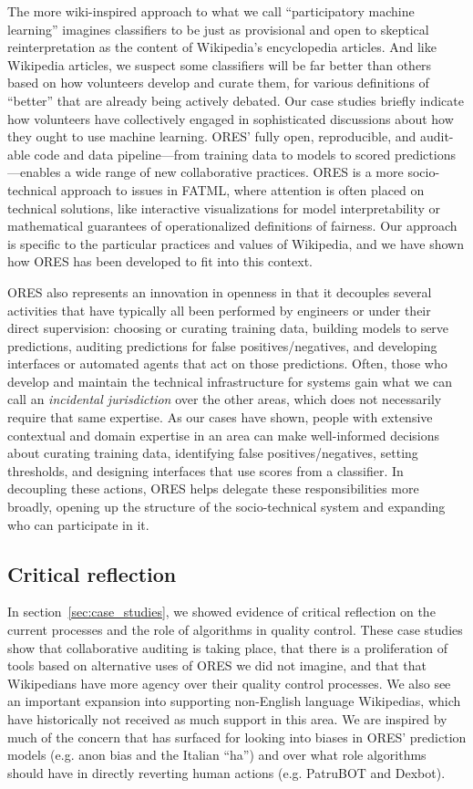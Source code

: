 The more wiki-inspired approach to what we call ``participatory machine learning'' imagines classifiers to be just as provisional and open to skeptical reinterpretation as the content of Wikipedia's encyclopedia articles. And like Wikipedia articles, we suspect some classifiers will be far better than others based on how volunteers develop and curate them, for various definitions of ``better'' that are already being actively debated. Our case studies briefly indicate how volunteers have collectively engaged in sophisticated discussions about how they ought to use machine learning. ORES' fully open, reproducible, and audit-able code and data pipeline---from training data to models to scored predictions---enables a wide range of new collaborative practices. ORES is a more socio-technical approach to issues in FATML, where attention is often placed on technical solutions, like interactive visualizations for model interpretability or mathematical guarantees of operationalized definitions of fairness. Our approach is specific to the particular practices and values of Wikipedia, and we have shown how ORES has been developed to fit into this context.

ORES also represents an innovation in openness in that it decouples several activities that have typically all been performed by engineers or under their direct supervision: choosing or curating training data, building models to serve predictions, auditing predictions for false positives/negatives, and developing interfaces or automated agents that act on those predictions. Often, those who develop and maintain the technical infrastructure for systems gain what we can call an \textit{incidental jurisdiction} over the other areas, which does not necessarily require that same expertise. As our cases have shown, people with extensive contextual and domain expertise in an area can make well-informed decisions about curating training data, identifying false positives/negatives, setting thresholds, and designing interfaces that use scores from a classifier. In decoupling these actions, ORES helps delegate these responsibilities more broadly, opening up the structure of the socio-technical system and expanding who can participate in it.

\subsection{Critical reflection}
In section~\ref{sec:case_studies}, we showed evidence of critical reflection on the current processes and the role of algorithms in quality control.  These case studies show that collaborative auditing is taking place, that there is a proliferation of tools based on alternative uses of ORES we did not imagine, and that that Wikipedians have more agency over their quality control processes. We also see an important expansion into supporting non-English language Wikipedias, which have historically not received as much support in this area. We are inspired by much of the concern that has surfaced for looking into biases in ORES' prediction models (e.g. anon bias and the Italian ``ha'') and over what role algorithms should have in directly reverting human actions (e.g. PatruBOT and Dexbot).

